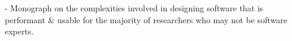 - Monograph on the complexities involved in designing software that is performant \& usable for the majority of researchers who may not be software experts.


